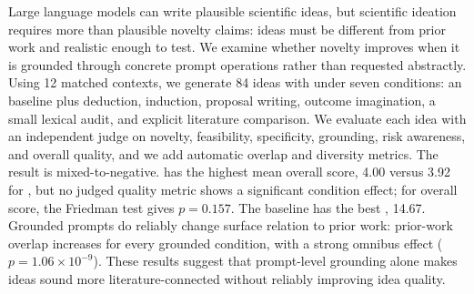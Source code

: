 Large language models can write plausible scientific ideas, but scientific ideation requires more than plausible novelty claims: ideas must be different from prior work and realistic enough to test. We examine whether novelty improves when it is grounded through concrete prompt operations rather than requested abstractly. Using 12 matched \aibidea contexts, we generate 84 ideas with \gptmini under seven conditions: an \ungrounded baseline plus deduction, induction, proposal writing, outcome imagination, a small lexical audit, and explicit literature comparison. We evaluate each idea with an independent \geminiflash judge on novelty, feasibility, specificity, grounding, risk awareness, and overall quality, and we add automatic overlap and diversity metrics. The result is mixed-to-negative. \litcompare has the highest mean overall score, 4.00 versus 3.92 for \ungrounded, but no judged quality metric shows a significant condition effect; for overall score, the Friedman test gives $p=0.157$. The \ungrounded baseline has the best \nfprod, 14.67. Grounded prompts do reliably change surface relation to prior work: prior-work overlap increases for every grounded condition, with a strong omnibus effect ($p=1.06\times 10^{-9}$). These results suggest that prompt-level grounding alone makes ideas sound more literature-connected without reliably improving idea quality.
